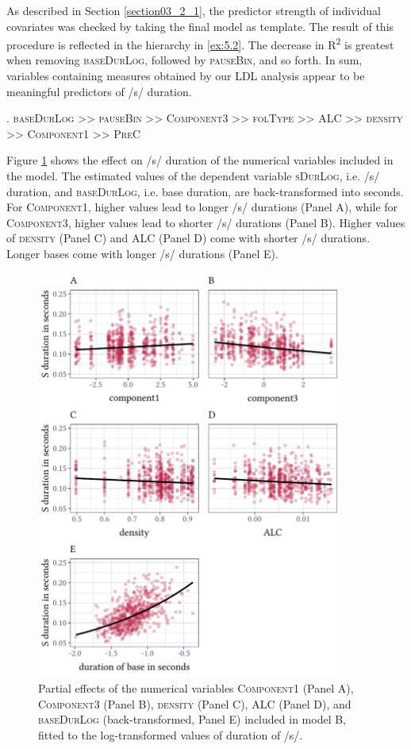 As described in Section \ref{section03_2_1}, the predictor strength of individual covariates was checked by taking the final model as template. The result of this procedure is reflected in the hierarchy in \ref{ex:5.2}. The decrease in R\textsuperscript{2} is greatest when removing \textsc{baseDurLog}, followed by \textsc{pauseBin}, and so forth. In sum, variables containing measures obtained by our LDL analysis appear to be meaningful predictors of /s/ duration.

\ex.
\label{ex:5.2}
\textsc{baseDurLog >> pauseBin >> Component3 >> folType >> ALC >> density >> Component1 >> PreC}

Figure \ref{fig:5_1} shows the effect on /s/ duration of the numerical variables included in the model. The estimated values of the dependent variable \textsc{sDurLog}, i.e. /s/ duration, and \textsc{baseDurLog}, i.e. base duration, are back-transformed into seconds. For \textsc{Component1}, higher values lead to longer /s/ durations (Panel A), while for \textsc{Component3}, higher values lead to shorter /s/ durations (Panel B). Higher values of \textsc{density} (Panel C) and \textsc{ALC} (Panel D) come with shorter /s/ durations. Longer bases come with longer /s/ durations (Panel E).

\begin{figure}
    \centering
    \includegraphics[width=0.9\textwidth]{figures/fig5.1.pdf}
    \caption{Partial effects of the numerical variables \textsc{Component1} (Panel A), \textsc{Component3} (Panel B), \textsc{density} (Panel C), \textsc{ALC} (Panel D), and \textsc{baseDurLog} (back-transformed, Panel E) included in model B, fitted to the log-transformed values of duration of /s/.}
    \label{fig:5_1}
\end{figure}

